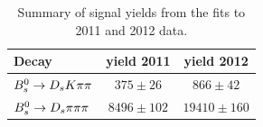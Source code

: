 \begin{table}[h]
\centering
\begin{tabular}{l c c}
Decay & yield 2011 & yield 2012\\
\hline
${{B}^0_{s}}\rightarrow{\ensuremath{{D}_{s}}}{\ensuremath{K}}{\ensuremath{\pi}}{\ensuremath{\pi}}$ &  $375 \pm  26$   &  $866 \pm 42$\\
${{B}^0_{s}}\rightarrow{\ensuremath{{D}_{s}}}{\ensuremath{\pi}}{\ensuremath{\pi}}{\ensuremath{\pi}}$ &  $8496 \pm 102$  &  $19410 \pm 160$\\
\hline
\end{tabular}
\caption{Summary of signal yields from the fits to 2011 and 2012 data.}
\label{tab: SigYields}
\end{table}

